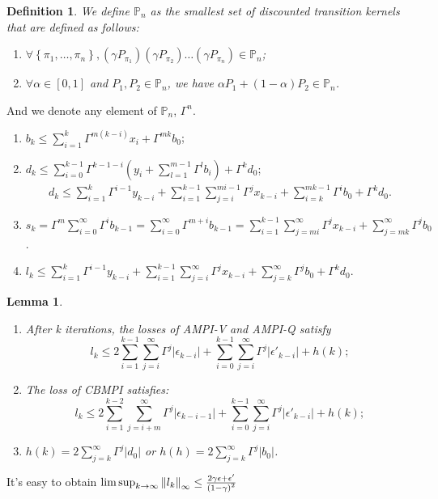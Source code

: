 \documentclass[a4paper]{article}
\newtheorem{lemma}{Lemma}
\newtheorem{definition}{Definition}
\begin{document}
\begin{definition}
    We define $ \mathbb{P}_n $ as the smallest set of discounted transition kernels that are defined as follows:
    \begin{enumerate}
        \item $ \forall \left\{ \pi_1, \ldots, \pi_n \right\}, (\gamma P_{\pi_1})(\gamma P_{\pi_2})\ldots (\gamma P_{\pi_n}) \in \mathbb{P}_n $;
        \item $ \forall \alpha \in [0,1] $ and $ P_1, P_2 \in \mathbb{P}_n $, we have $ \alpha P_1 + (1 - \alpha) P_2 \in \mathbb{P}_n $.
    \end{enumerate}
\end{definition}

And we denote any element of $ \mathbb{P}_n $, $ \Gamma^n $.
\begin{enumerate}
    \item $ b_k \le \sum^{k}_{i=1} \Gamma^{m(k-i)} x_i + \Gamma^{mk}b_0 $;
    \item $ d_k \le \sum^{k-1}_{i=0} \Gamma^{k-1-i} \left( y_i + \sum^{m-1}_{l=1} \Gamma^{l} b_i\right) + \Gamma^{k}d_0 $;
        \begin{align*}
            d_k \le \sum^{k}_{i=1}  \Gamma^{i-1} y_{k-i} 
            + \sum^{k-1}_{i=1} \sum^{mi-1}_{j=i} \Gamma^j x_{k-i}
            + \sum^{mk-1}_{i=k} \Gamma^{i} b_0 + \Gamma^k d_0.
        \end{align*}
    \item $ s_k = \Gamma^m \sum^{\infty}_{i=0} \Gamma^i b_{k-1} = \sum^{\infty}_{i=0} \Gamma^{m+i}b_{k-1} = \sum^{k-1}_{i=1} \sum^{\infty}_{j=mi} \Gamma^{j} x_{k-i} + \sum^{\infty}_{j = mk} \Gamma^j b_0 $.
        \item $ l_k \le \sum^{k}_{i=1} \Gamma^{i-1} y_{k-i} + \sum^{k-1}_{i=1} \sum^{\infty}_{j=i} \Gamma^{j} x_{k-i} + \sum^{\infty}_{j=k} \Gamma^j b_0 + \Gamma^k d_0 $.
\end{enumerate}
\begin{lemma}
    \begin{enumerate}
        \item After k iterations, the losses of AMPI-V and AMPI-Q satisfy
            \[
                l_k \le 2 \sum^{k-1}_{i=1} \sum^{\infty}_{j=i} \Gamma^{j} \left| \epsilon_{k-i} \right|
                + \sum^{k-1}_{i=0} \sum^{\infty}_{j=i} \Gamma^j \left| \epsilon'_{k-i} \right| + h(k);
            \]
        \item The loss of CBMPI satisfies:
            \[
                l_k \le 2 \sum^{k-2}_{i=1} \sum^{\infty}_{j=i+m} \Gamma^{j} \left| \epsilon_{k-i-1} \right|
                + \sum^{k-1}_{i=0} \sum^{\infty}_{j=i} \Gamma^j \left| \epsilon'_{k-i} \right| + h(k);
            \]
        \item $ h(k) = 2 \sum^{\infty}_{j=k} \Gamma^j \left| d_0 \right| $ or $ h(h) = 2 \sum^{\infty}_{j=k} \Gamma^j \left| b_0 \right| $.
    \end{enumerate}
\end{lemma}

It's easy to obtain $ \limsup_{k \rightarrow \infty} {\Arrowvert l_k \Arrowvert}_\infty \le \frac{2\gamma \epsilon + \epsilon'}{{(1 - \gamma)}^{2}}  $
\end{document}

